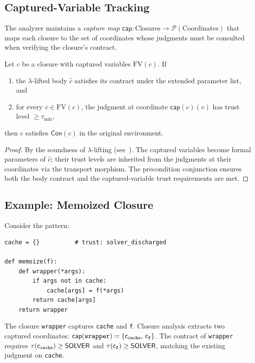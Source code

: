 \documentclass[11pt]{article}
\newcommand{\FV}{\mathrm{FV}}                  %
\newcommand{\Contract}{\mathsf{Con}}           %
\newcommand{\capture}{\mathsf{cap}}            %
\begin{document}
\subsection{Captured-Variable Tracking}

The analyzer maintains a \emph{capture map} $\capture :
\mathrm{Closures} \to \mathcal{P}(\mathrm{Coordinates})$ that maps
each closure to the set of coordinates whose judgments must be
consulted when verifying the closure's contract.

\begin{lemma}\label{lem:closuresound}
Let $c$ be a closure with captured variables $\FV(c)$.  If
\begin{enumerate}
  \item the $\lambda$-lifted body $\hat{c}$ satisfies its contract
        under the extended parameter list, and
  \item for every $v \in \FV(c)$, the judgment at coordinate
        $\capture(c)(v)$ has trust level $\ge \tau_{\min}$,
\end{enumerate}
then $c$ satisfies $\Contract(c)$ in the original environment.
\end{lemma}

\begin{proof}
By the soundness of $\lambda$-lifting (see~\cite{danvy1992pragmatics}).
The captured variables become formal parameters of $\hat{c}$; their
trust levels are inherited from the judgments at their coordinates via
the transport morphism.  The precondition conjunction ensures both
the body contract and the captured-variable trust requirements are met.
\end{proof}

\subsection{Example: Memoized Closure}

\begin{example}\label{ex:memoize}
Consider the pattern:
\begin{lstlisting}[style=jugeo-python]
cache = {}          # trust: solver_discharged

def memoize(f):
    def wrapper(*args):
        if args not in cache:
            cache[args] = f(*args)
        return cache[args]
    return wrapper
\end{lstlisting}
The closure \texttt{wrapper} captures \texttt{cache} and \texttt{f}.
Closure analysis extracts two captured coordinates:
$\capture(\texttt{wrapper}) = \{\coord_{\texttt{cache}},\,
\coord_{\texttt{f}}\}$.
The contract of \texttt{wrapper} requires
$\tau(\mathsf{c}_{\texttt{cache}}) \ge \mathsf{SOLVER}$ and
$\tau(\mathsf{c}_{\texttt{f}}) \ge \mathsf{SOLVER}$, matching the existing
judgment on \texttt{cache}.
\end{example}
\end{document}
